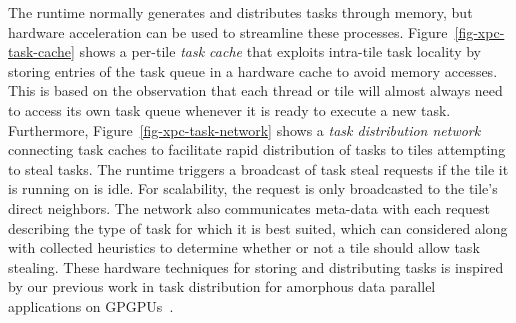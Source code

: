 The runtime normally generates and distributes tasks through memory, but
hardware acceleration can be used to streamline these
processes. Figure~\ref{fig-xpc-task-cache} shows a per-tile \emph{task
  cache} that exploits intra-tile task locality by storing entries of the
task queue in a hardware cache to avoid memory accesses. This is based on
the observation that each thread or tile will almost always need to
access its own task queue whenever it is ready to execute a new
task. Furthermore, Figure~\ref{fig-xpc-task-network} shows a \emph{task
  distribution network} connecting task caches to facilitate rapid
distribution of tasks to tiles attempting to steal tasks. The runtime
triggers a broadcast of task steal requests if the tile it is running on
is idle. For scalability, the request is only broadcasted to the tile's
direct neighbors. The network also communicates meta-data with each
request describing the type of task for which it is best suited, which
can considered along with collected heuristics to determine whether or
not a tile should allow task stealing. These hardware techniques for
storing and distributing tasks is inspired by our previous work in task
distribution for amorphous data parallel applications on
GPGPUs~\cite{kim-hwwl-micro2014}.
